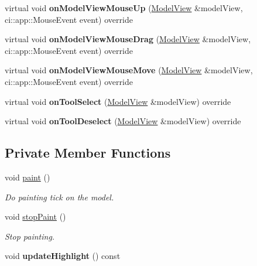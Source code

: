 \begin{DoxyCompactItemize}
virtual void {\bfseries on\+Model\+View\+Mouse\+Up} (\mbox{\hyperlink{classpepr3d_1_1_model_view}{Model\+View}} \&model\+View, ci\+::app\+::\+Mouse\+Event event) override
\item 
\mbox{\label{classpepr3d_1_1_brush_abfe0a46814dcd751d3801a8dfacd07cb}} 
virtual void {\bfseries on\+Model\+View\+Mouse\+Drag} (\mbox{\hyperlink{classpepr3d_1_1_model_view}{Model\+View}} \&model\+View, ci\+::app\+::\+Mouse\+Event event) override
\item 
\mbox{\label{classpepr3d_1_1_brush_a5708ed96781b524410ac440ead73507f}} 
virtual void {\bfseries on\+Model\+View\+Mouse\+Move} (\mbox{\hyperlink{classpepr3d_1_1_model_view}{Model\+View}} \&model\+View, ci\+::app\+::\+Mouse\+Event event) override
\item 
\mbox{\label{classpepr3d_1_1_brush_ae73bad242cb367db774983ba3bd9022f}} 
virtual void {\bfseries on\+Tool\+Select} (\mbox{\hyperlink{classpepr3d_1_1_model_view}{Model\+View}} \&model\+View) override
\item 
\mbox{\label{classpepr3d_1_1_brush_a6c6e2fb6715017a34ac7269b871cbf6d}} 
virtual void {\bfseries on\+Tool\+Deselect} (\mbox{\hyperlink{classpepr3d_1_1_model_view}{Model\+View}} \&model\+View) override
\end{DoxyCompactItemize}
\subsection*{Private Member Functions}
\begin{DoxyCompactItemize}
\item 
\mbox{\label{classpepr3d_1_1_brush_af5e005149a8d975bcdeebc3432388572}} 
void \mbox{\hyperlink{classpepr3d_1_1_brush_af5e005149a8d975bcdeebc3432388572}{paint}} ()
\begin{DoxyCompactList}\small\item\em Do painting tick on the model. \end{DoxyCompactList}\item 
\mbox{\label{classpepr3d_1_1_brush_af329ad67cb6de39d79e50b6ad61d5de6}} 
void \mbox{\hyperlink{classpepr3d_1_1_brush_af329ad67cb6de39d79e50b6ad61d5de6}{stop\+Paint}} ()
\begin{DoxyCompactList}\small\item\em Stop painting. \end{DoxyCompactList}\item 
\mbox{\label{classpepr3d_1_1_brush_a3aad03f4f6bef63974c10c35d2ca9903}} 
void {\bfseries update\+Highlight} () const
\end{DoxyCompactItemize}
